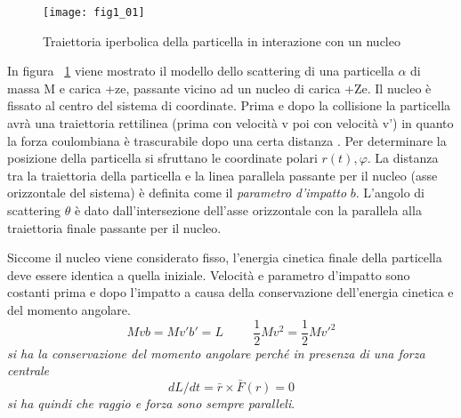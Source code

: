 \begin{figure}[h]
\centering
\texttt{[image: fig1\_01]}
\caption{Traiettoria iperbolica della particella in interazione con un nucleo}
\label{fig:1.1}
\end{figure}
In figura ~\ref{fig:1.1} viene mostrato il modello dello scattering di una particella $\alpha$ di massa M e carica +ze, passante vicino ad un nucleo di carica +Ze.
Il nucleo è fissato al centro del sistema di coordinate.
Prima e dopo la collisione la particella avrà una traiettoria rettilinea (prima con velocità v poi con velocità v') in quanto la forza coulombiana è trascurabile dopo una certa distanza .
Per determinare la posizione della particella si sfruttano le coordinate polari $r(t), \varphi$. 
La distanza tra la traiettoria della particella e la linea parallela passante per il nucleo (asse orizzontale del sistema) è definita come il \emph{parametro d'impatto} $b$.
L'angolo di scattering $\theta$ è dato dall'intersezione dell'asse orizzontale con la parallela alla traiettoria finale passante per il nucleo.

Siccome il nucleo viene considerato fisso, l'energia cinetica finale della particella deve essere identica a quella iniziale. 
Velocità e parametro d'impatto sono costanti prima e dopo l'impatto a causa della conservazione dell'energia cinetica e del momento angolare.
\begin{equation}
Mvb=Mv'b'=L \hspace{1cm} \frac{1}{2}Mv^2=\frac{1}{2}Mv'^2
\end{equation}
\emph{si ha la conservazione del momento angolare perché in presenza di una forza centrale}
\[
dL/dt=\bar r \times \bar F (r)=0
\]
\emph{si ha quindi che raggio e forza sono sempre paralleli}.

